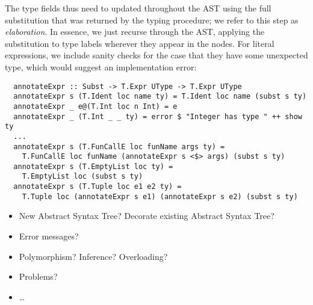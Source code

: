 The type fields thus need to updated throughout the AST using the full
substitution that was returned by the typing procedure; we refer to this step as
\emph{elaboration}.
In essence, we just recurse through the AST, applying the substitution to type
labels wherever they appear in the nodes.
For literal expressions, we include sanity checks for the case that they have
some unexpected type, which would suggest an implementation error:
\begin{verbatim}
  annotateExpr :: Subst -> T.Expr UType -> T.Expr UType
  annotateExpr s (T.Ident loc name ty) = T.Ident loc name (subst s ty)
  annotateExpr _ e@(T.Int loc n Int) = e
  annotateExpr _ (T.Int _ _ ty) = error $ "Integer has type " ++ show ty
  ...
  annotateExpr s (T.FunCallE loc funName args ty) =
    T.FunCallE loc funName (annotateExpr s <$> args) (subst s ty)
  annotateExpr s (T.EmptyList loc ty) =
    T.EmptyList loc (subst s ty)
  annotateExpr s (T.Tuple loc e1 e2 ty) =
    T.Tuple loc (annotateExpr s e1) (annotateExpr s e2) (subst s ty)
\end{verbatim}




\begin{todoenv}
  \begin{itemize}
    \item New Abstract Syntax Tree? Decorate existing Abstract Syntax Tree?
    \item Error messages?
    \item Polymorphism? Inference? Overloading?
    \item Problems?
    \item\ldots
  \end{itemize}
\end{todoenv}
